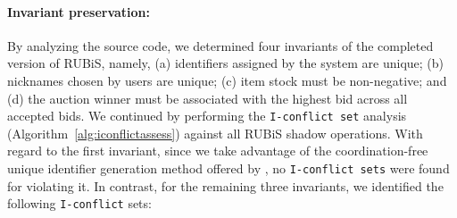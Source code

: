 \noindent\paragraph{Invariant preservation:} By analyzing the source code, we determined
four invariants of the completed version of RUBiS, namely, (a) identifiers 
assigned by the system are unique; (b) nicknames chosen by
users are unique; (c) item stock must be non-negative; and (d) the auction 
winner must be associated with the highest bid across all accepted bids. We continued by
performing the {\tt I-conflict set} analysis (Algorithm~\ref{alg:iconflictassess}) against all RUBiS shadow operations. With regard
to the first invariant, since we take advantage of the coordination-free unique identifier generation method
offered by \tool, no {\tt I-conflict sets} were found for violating it. In contrast, 
for the remaining three invariants, we identified
the following {\tt I-conflict} sets: 

